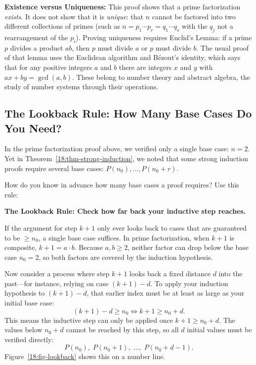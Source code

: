 \begin{connectionbox}
\textbf{Existence versus Uniqueness:} This proof shows that a prime factorization \emph{exists}. It does not show that it is \emph{unique}: that $n$ cannot be factored into two different collections of primes (such as $n = p_1 \cdots p_r = q_1 \cdots q_s$ with the $q_j$ not a rearrangement of the $p_i$). Proving uniqueness requires Euclid's Lemma: if a prime $p$ divides a product $ab$, then $p$ must divide $a$ or $p$ must divide $b$. The usual proof of that lemma uses the Euclidean algorithm and B\'ezout's identity, which says that for any positive integers $a$ and $b$ there are integers $x$ and $y$ with $ax + by = \gcd(a, b)$. These belong to number theory and abstract algebra, the study of number systems through their operations.
\end{connectionbox}

\subsection{The Lookback Rule: How Many Base Cases Do You Need?}

In the prime factorization proof above, we verified only a single base case: $n = 2$. Yet in Theorem~\ref{18:thm-strong-induction}, we noted that some strong induction proofs require several base cases: $P(n_0), \dots, P(n_0 + r)$. 

How do you know in advance how many base cases a proof requires? Use this rule:
\begin{center}
\textbf{The Lookback Rule: Check how far back your inductive step reaches.}
\end{center}

If the argument for step $k+1$ only ever looks back to cases that are guaranteed to be $\ge n_0$, a single base case suffices. In prime factorization, when $k+1$ is composite, $k+1 = a \cdot b$. Because $a, b \ge 2$, neither factor can drop below the base case $n_0 = 2$, so both factors are covered by the induction hypothesis.

Now consider a process where step $k+1$ looks back a fixed distance $d$ into the past---for instance, relying on case $(k+1) - d$. To apply your induction hypothesis to $(k+1) - d$, that earlier index must be at least as large as your initial base case:
\[
(k+1) - d \ge n_0 \iff k+1 \ge n_0 + d.
\]
This means the inductive step can only be applied once $k+1 \ge n_0 + d$. The values below $n_0 + d$ cannot be reached by this step, so all $d$ initial values must be verified directly:
\[
P(n_0), \; P(n_0 + 1), \; \dots, \; P(n_0 + d - 1).
\]
Figure~\ref{18:fig-lookback} shows this on a number line.

